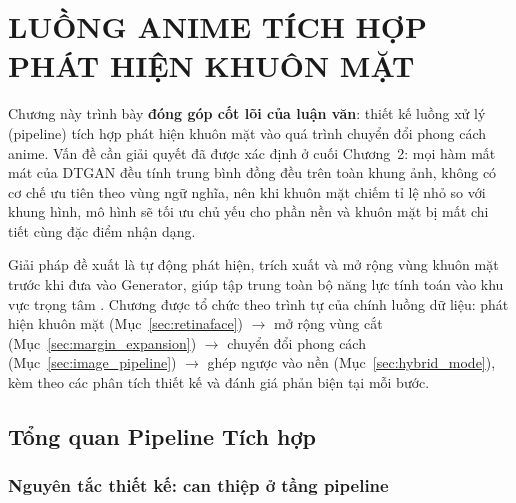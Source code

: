\clearpage


\setcounter{chapter}{2}
\chapter[{LUỒNG ANIME TÍCH HỢP PHÁT HIỆN KHUÔN MẶT}]{LUỒNG ANIME TÍCH HỢP PHÁT HIỆN KHUÔN MẶT}

\algrenewcommand{}
\algrenewcommand{}
\algrenewcommand{}
\algrenewcommand{}
\algrenewcommand{}
\algrenewcommand{}
\algrenewcommand{}
\algrenewcommand{}
\algrenewcommand{}

Chương này trình bày \textbf{đóng góp cốt lõi của luận văn}: thiết kế luồng xử lý (pipeline) tích hợp phát hiện khuôn mặt vào quá trình chuyển đổi phong cách anime. Vấn đề cần giải quyết đã được xác định ở cuối Chương~2: mọi hàm mất mát của DTGAN đều tính trung bình đồng đều trên toàn khung ảnh, không có cơ chế ưu tiên theo vùng ngữ nghĩa, nên khi khuôn mặt chiếm tỉ lệ nhỏ so với khung hình, mô hình sẽ tối ưu chủ yếu cho phần nền và khuôn mặt bị mất chi tiết cùng đặc điểm nhận dạng.

Giải pháp đề xuất là tự động phát hiện, trích xuất và mở rộng vùng khuôn mặt trước khi đưa vào Generator, giúp tập trung toàn bộ năng lực tính toán vào khu vực trọng tâm \cite{Liu2024, Deng2019RetinaFace}. Chương được tổ chức theo trình tự của chính luồng dữ liệu: phát hiện khuôn mặt (Mục~\ref{sec:retinaface}) $\rightarrow$ mở rộng vùng cắt (Mục~\ref{sec:margin_expansion}) $\rightarrow$ chuyển đổi phong cách (Mục~\ref{sec:image_pipeline}) $\rightarrow$ ghép ngược vào nền (Mục~\ref{sec:hybrid_mode}), kèm theo các phân tích thiết kế và đánh giá phản biện tại mỗi bước.

\section{Tổng quan Pipeline Tích hợp}
\label{sec:fe_overview}

\subsection{Nguyên tắc thiết kế: can thiệp ở tầng pipeline}
\label{subsec:design_principle}

